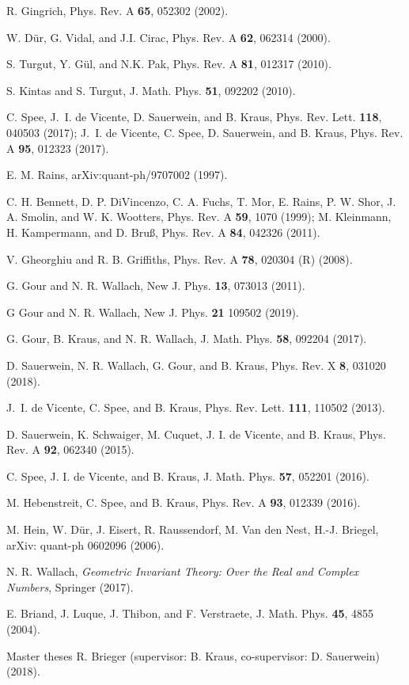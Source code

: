 \documentclass[superscriptaddress,twocolumn]{revtex4}\usepackage[utf8]{inputenc}
\begin{document}
\begin{thebibliography}{99}
 R. Gingrich, Phys. Rev. A \textbf{65}, 052302 (2002).

 W. D\"ur, G. Vidal, and J.I. Cirac, Phys. Rev. A \textbf{62}, 062314 (2000).

 S. Turgut, Y. G\"ul, and N.K. Pak, Phys. Rev. A \textbf{81}, 012317 (2010).

 S. Kintas and S. Turgut, J. Math. Phys. \textbf{51}, 092202 (2010).

 C. Spee, J.~I. de Vicente, D. Sauerwein, and B. Kraus, Phys. Rev. Lett. \textbf{118}, 040503 (2017); J.~I. de Vicente, C. Spee, D. Sauerwein, and B. Kraus, Phys. Rev. A \textbf{95}, 012323 (2017).
    
 E. M. Rains, arXiv:quant-ph/9707002 (1997).
    
 C. H. Bennett, D. P. DiVincenzo, C. A. Fuchs, T. Mor, E. Rains, P. W. Shor, J. A. Smolin, and W. K. Wootters, Phys. Rev. A \textbf{59}, 1070 (1999); M. Kleinmann, H. Kampermann, and D. Bru{\ss}, Phys. Rev. A \textbf{84}, 042326 (2011).

 V. Gheorghiu and R. B. Griffiths, Phys. Rev. A \textbf{78}, 020304 (R) (2008).

 G. Gour and N. R. Wallach, New J. Phys. \textbf{13}, 073013 (2011).

 G Gour and N. R. Wallach, New J. Phys. \textbf{21} 109502 (2019).

 G. Gour, B. Kraus, and N. R. Wallach, J. Math. Phys. \textbf{58}, 092204 (2017).

 D. Sauerwein, N. R. Wallach, G. Gour, and B. Kraus, Phys. Rev. X \textbf{8}, 031020 (2018).

 J.~I. de Vicente, C. Spee, and B. Kraus, Phys. Rev. Lett. \textbf{111}, 110502 (2013).

 D. Sauerwein, K. Schwaiger, M. Cuquet, J. I. de Vicente, and B. Kraus, Phys. Rev. A \textbf{92}, 062340 (2015).

 C. Spee, J. I. de Vicente, and B. Kraus, J. Math. Phys. \textbf{57}, 052201 (2016).

 M. Hebenstreit, C. Spee, and B. Kraus, Phys. Rev. A \textbf{93}, 012339 (2016).

 M. Hein, W. Dür, J. Eisert, R. Raussendorf, M. Van den Nest, H.-J. Briegel, arXiv: quant-ph 0602096 (2006).

 N. R. Wallach, \textit{Geometric Invariant Theory: Over the Real and Complex Numbers}, Springer (2017).

 E. Briand, J. Luque, J. Thibon, and F. Verstraete, J. Math. Phys. \textbf{45}, 4855 (2004).

 Master theses R. Brieger (supervisor: B. Kraus, co-supervisor: D. Sauerwein) (2018).




\end{thebibliography}
\end{document}
